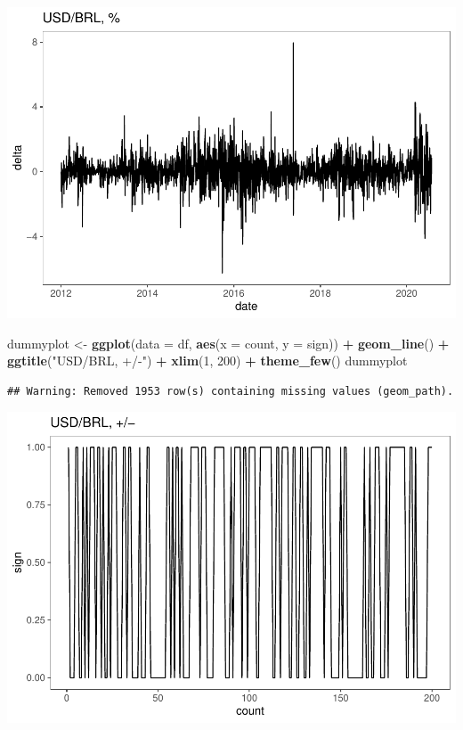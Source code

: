 \documentclass[11pt, a4paper]{report}
\newenvironment{Shaded}{\begin{snugshade}}{\end{snugshade}}
\newcommand{\DataTypeTok}[1]{\textcolor[rgb]{0.13,0.29,0.53}{#1}}
\newcommand{\DecValTok}[1]{\textcolor[rgb]{0.00,0.00,0.81}{#1}}
\newcommand{\KeywordTok}[1]{\textcolor[rgb]{0.13,0.29,0.53}{\textbf{#1}}}
\newcommand{\NormalTok}[1]{#1}
\newcommand{\OperatorTok}[1]{\textcolor[rgb]{0.81,0.36,0.00}{\textbf{#1}}}
\newcommand{\StringTok}[1]{\textcolor[rgb]{0.31,0.60,0.02}{#1}}
\theoremstyle{plain}
\theoremstyle{plain}
\theoremstyle{remark}
\begin{document}
\begin{center}\includegraphics{Econo2_P1_files/figure-latex/plots-2} \end{center}

\begin{Shaded}
\begin{Highlighting}[]
\NormalTok{dummyplot <-}\StringTok{ }\KeywordTok{ggplot}\NormalTok{(}\DataTypeTok{data =}\NormalTok{ df, }\KeywordTok{aes}\NormalTok{(}\DataTypeTok{x =}\NormalTok{ count, }\DataTypeTok{y =}\NormalTok{ sign)) }\OperatorTok{+}\StringTok{ }\KeywordTok{geom_line}\NormalTok{() }\OperatorTok{+}\StringTok{ }
\StringTok{    }\KeywordTok{ggtitle}\NormalTok{(}\StringTok{"USD/BRL, +/-"}\NormalTok{) }\OperatorTok{+}\StringTok{ }\KeywordTok{xlim}\NormalTok{(}\DecValTok{1}\NormalTok{, }\DecValTok{200}\NormalTok{) }\OperatorTok{+}\StringTok{ }\KeywordTok{theme_few}\NormalTok{()}
\NormalTok{dummyplot}
\end{Highlighting}
\end{Shaded}

\begin{verbatim}
## Warning: Removed 1953 row(s) containing missing values (geom_path).
\end{verbatim}

\begin{center}\includegraphics{Econo2_P1_files/figure-latex/plots-3} \end{center}
\end{document}
